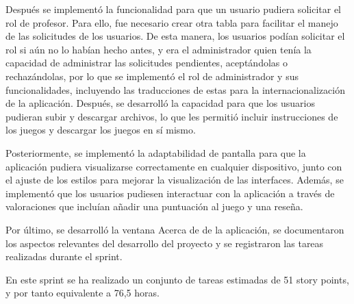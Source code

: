 Después se implementó la funcionalidad para que un usuario pudiera solicitar el rol de profesor. Para ello, fue necesario crear otra tabla para facilitar el manejo de las solicitudes de los usuarios. De esta manera, los usuarios podían solicitar el rol si aún no lo habían hecho antes, y era el administrador quien tenía la capacidad de administrar las solicitudes pendientes, aceptándolas o rechazándolas, por lo que se implementó el rol de administrador y sus funcionalidades, incluyendo las traducciones de estas para la internacionalización de la aplicación.
Después, se desarrolló la capacidad para que los usuarios pudieran subir y descargar archivos, lo que les permitió incluir instrucciones de los juegos y descargar los juegos en sí mismo.

Posteriormente, se implementó la adaptabilidad de pantalla para que la aplicación pudiera visualizarse correctamente en cualquier dispositivo, junto con el ajuste de los estilos para mejorar la visualización de las interfaces. Además, se implementó que los usuarios pudiesen interactuar con la aplicación a través de valoraciones que incluían añadir una puntuación al juego y una reseña.

Por último, se desarrolló la ventana Acerca de de la aplicación, se documentaron los aspectos relevantes del desarrollo del proyecto y se registraron las tareas realizadas durante el sprint.

En este sprint se ha realizado un conjunto de tareas estimadas de 51 story points, y por tanto equivalente a 76,5 horas.

